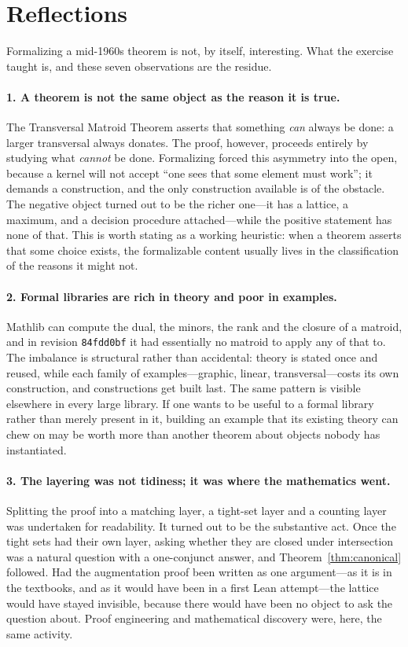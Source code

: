 \documentclass[11pt]{article}
\newcommand{\lean}[1]{\texttt{#1}}
\begin{document}
\section{Reflections}\label{sec:reflections}

Formalizing a mid-1960s theorem is not, by itself, interesting. What the exercise taught is, and
these seven observations are the residue.

\paragraph{1. A theorem is not the same object as the reason it is true.}
The Transversal Matroid Theorem asserts that something \emph{can} always be done: a larger
transversal always donates. The proof, however, proceeds entirely by studying what \emph{cannot}
be done. Formalizing forced this asymmetry into the open, because a kernel will not accept ``one
sees that some element must work''; it demands a construction, and the only construction available
is of the obstacle. The negative object turned out to be the richer one---it has a lattice, a
maximum, and a decision procedure attached---while the positive statement has none of that. This
is worth stating as a working heuristic: when a theorem asserts that some choice exists, the
formalizable content usually lives in the classification of the reasons it might not.

\paragraph{2. Formal libraries are rich in theory and poor in examples.}
Mathlib can compute the dual, the minors, the rank and the closure of a matroid, and in revision
\lean{84fdd0bf} it had essentially no matroid to apply any of that to. The imbalance is structural
rather than accidental: theory is stated once and reused, while each family of examples---graphic,
linear, transversal---costs its own construction, and constructions get built last. The same
pattern is visible elsewhere in every large library. If one wants to be useful to a formal library
rather than merely present in it, building an example that its existing theory can chew on may be
worth more than another theorem about objects nobody has instantiated.

\paragraph{3. The layering was not tidiness; it was where the mathematics went.}
Splitting the proof into a matching layer, a tight-set layer and a counting layer was undertaken
for readability. It turned out to be the substantive act. Once the tight sets had their own layer,
asking whether they are closed under intersection was a natural question with a one-conjunct
answer, and Theorem~\ref{thm:canonical} followed. Had the augmentation proof been written as one
argument---as it is in the textbooks, and as it would have been in a first Lean attempt---the
lattice would have stayed invisible, because there would have been no object to ask the question
about. Proof engineering and mathematical discovery were, here, the same activity.
\end{document}
